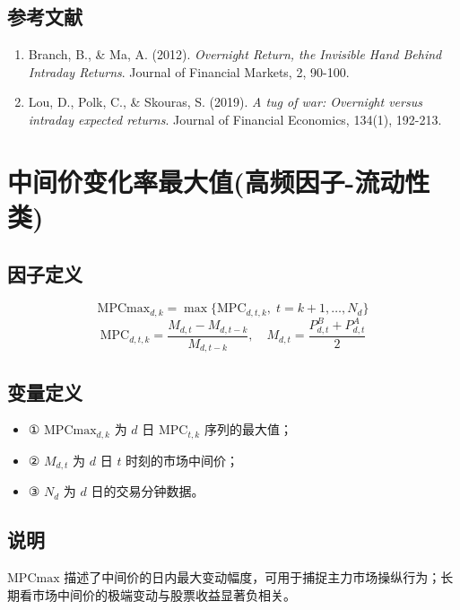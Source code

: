 \documentclass{article}
\begin{document}
\subsection{参考文献}
\begin{enumerate}
    \item Branch, B., \& Ma, A. (2012). \textit{Overnight Return, the Invisible Hand Behind Intraday Returns}. Journal of Financial Markets, 2, 90-100.
    \item Lou, D., Polk, C., \& Skouras, S. (2019). \textit{A tug of war: Overnight versus intraday expected returns}. Journal of Financial Economics, 134(1), 192-213.
\end{enumerate}

\section{中间价变化率最大值(高频因子-流动性类)}

\subsection{因子定义}

\begin{equation}
    \mathrm{MPCmax}_{d,k} = \max \{ \mathrm{MPC}_{d,t,k}, \; t = k+1, \ldots, N_d \}
\end{equation}
\begin{equation}
    \mathrm{MPC}_{d,t,k} = \frac{M_{d,t} - M_{d,t-k}}{M_{d,t-k}}, \quad M_{d,t} = \frac{P_{d,t}^B + P_{d,t}^A}{2}
\end{equation}

\subsection{变量定义}
\begin{itemize}
    \item ① \( \mathrm{MPCmax}_{d,k} \) 为 \( d \) 日 \( \mathrm{MPC}_{t,k} \) 序列的最大值；
    \item ② \( M_{d,t} \) 为 \( d \) 日 \( t \) 时刻的市场中间价；
    \item ③ \( N_d \) 为 \( d \) 日的交易分钟数据。
\end{itemize}

\subsection{说明}
\( \mathrm{MPCmax} \) 描述了中间价的日内最大变动幅度，可用于捕捉主力市场操纵行为；长期看市场中间价的极端变动与股票收益显著负相关。
\end{document}
